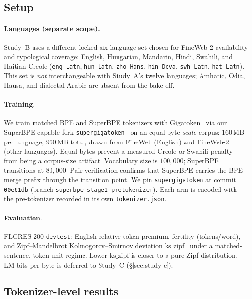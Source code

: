 \documentclass[11pt,a4paper]{article}
\begin{document}
\subsection{Setup}

\paragraph{Languages (separate scope).}
Study~B uses a different locked six-language set chosen for FineWeb-2 availability and typological coverage:
English, Hungarian, Mandarin, Hindi, Swahili, and Haitian Creole
(\texttt{eng\_Latn}, \texttt{hun\_Latn}, \texttt{zho\_Hans}, \texttt{hin\_Deva}, \texttt{swh\_Latn}, \texttt{hat\_Latn}).
This set is \emph{not} interchangeable with Study~A's twelve languages; Amharic, Odia, Hausa, and dialectal Arabic are absent from the bake-off.

\paragraph{Training.}
We train matched BPE and SuperBPE tokenizers with Gigatoken~\citep{roed2026gigatoken} via our SuperBPE-capable fork \texttt{supergigatoken}~\citep{verma2026supergigatoken} on an equal-byte \emph{scale} corpus: $160$\,MB per language, $960$\,MB total, drawn from FineWeb (English) and FineWeb-2 (other languages).
Equal bytes prevent a measured Creole or Swahili penalty from being a corpus-size artifact.
Vocabulary size is $100{,}000$; SuperBPE transitions at $80{,}000$.
Pair verification confirms that SuperBPE carries the BPE merge prefix through the transition point.
We pin \texttt{supergigatoken} at commit \texttt{00e61db} (branch \texttt{superbpe-stage1-pretokenizer}).
Each arm is encoded with the pre-tokenizer recorded in its own \texttt{tokenizer.json}.

\paragraph{Evaluation.}
FLORES-200 \texttt{devtest}: English-relative token premium, fertility (tokens/word), and Zipf--Mandelbrot Kolmogorov--Smirnov deviation $\mathrm{ks\_zipf}$~\citep{clauset2009power} under a matched-sentence, token-unit regime.
Lower $\mathrm{ks\_zipf}$ is closer to a pure Zipf distribution.
LM bits-per-byte is deferred to Study~C (\S\ref{sec:study-c}).

\subsection{Tokenizer-level results}
\end{document}
